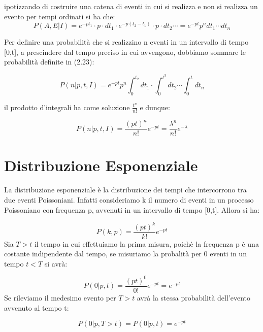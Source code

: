 \documentclass[11pt,a4paper]{book}
\begin{document}
ipotizzando di costruire una catena di eventi in cui si realizza e non si realizza un evento per tempi ordinati si ha che:
\begin{equation}
	P(A,E \vert I) = e^{-pt_1} \cdot p \cdot dt_1 \cdot e^{-p(t_2-t_1)} \cdot p \cdot dt_2 \cdots = e^{-pt}p^ndt_1 \cdots dt_n
\end{equation}

Per definire una probabilit\`{a} che si realizzino n eventi in un intervallo di tempo [0,t], a prescindere dal tempo preciso in cui avvengono, dobbiamo sommare le probabilit\`{a} definite in (2.23):

\begin{equation}
	P(n \vert p,t,I) = e^{-pt}p^n \int_0^{t_2}dt_{1} \cdot \int_{0}^{t^3}dt_{2} \cdots \int_{0}^{t}dt_n
\end{equation}

il prodotto d'integrali ha come soluzione $\frac{t^n}{n!}$ e dunque:

\begin{equation}
	P(n \vert p,t,I) = \dfrac{(pt)^n}{n!}e^{-pt} = \dfrac{\lambda^n}{n!}e^{-\lambda}
\end{equation} 

\section{Distribuzione Esponenziale}

La distribuzione esponenziale \`{e} la distribuzione dei tempi che intercorrono tra due eventi Poissoniani. Infatti consideriamo k il numero di eventi in un processo Poissoniano con frequenza p, avvenuti in un intervallo di tempo [0,t]. Allora si ha:

\begin{equation*}
	P(k,p) = \dfrac{(pt)^k}{k!}e^{-pt}
\end{equation*}
\newline
Sia $T > t$ il tempo in cui effettuiamo la prima misura, poich\`{e} la frequenza p \`{e} una costante indipendente dal tempo, se misuriamo la probalit\`{a} per 0 eventi in un tempo $t < T$ si avr\`{a}:

\begin{equation*}
	P(0 \vert p,t) = \dfrac{(pt)^0}{0!}e^{-pt} = e^{-pt}
\end{equation*}
\newline
Se rileviamo il medesimo evento per $T > t$ avr\`{a} la stessa probabilit\`{a} dell'evento avvenuto al tempo t:

\begin{equation*}
	P(0 \vert p, T>t) = P(0 \vert p, t) = e^{-pt}
\end{equation*}
 
\end{document}
